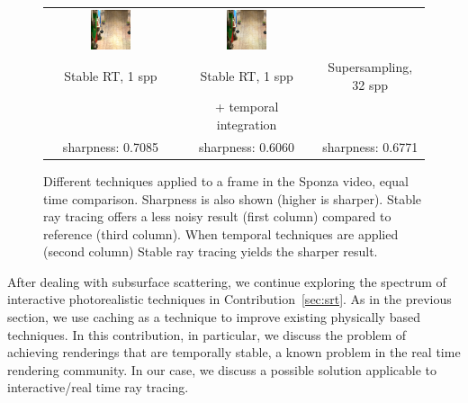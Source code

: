 \begin{figure}[t]
\begin{tabular}{@{}c@{}c@{}@{}c@{}}
	 	 \includegraphics[width=0.32\textwidth]{figures/srt_1_ti_rect_370_300_300_300_frame_211.png} &
	  \includegraphics[width=0.32\textwidth]{figures/ss_32x_rect_370_300_300_300_frame_211.png}
 \\
Stable RT, 1 spp & Stable RT, 1 spp & Supersampling, 32 spp \\
 & + temporal integration &  \\
sharpness: 0.7085 & sharpness: 0.6060 & sharpness: 0.6771 \\[-1.5ex]
\end{tabular}
\caption{Different techniques applied to a frame in the Sponza video, equal time comparison. Sharpness is also shown (higher is sharper). Stable ray tracing offers a less noisy result (first column) compared to reference (third column). When temporal techniques are applied (second column) Stable ray tracing yields the sharper result.  }
\label{fig:sponza_video_frame}
\end{figure}
After dealing with subsurface scattering, we continue exploring the spectrum of interactive photorealistic techniques in Contribution~\ref{sec:srt}. As in the previous section, we use caching as a technique to improve existing physically based techniques. In this contribution, in particular, we discuss the problem of achieving renderings that are temporally stable, a known problem in the real time rendering community. In our case, we discuss a possible solution applicable to interactive/real time ray tracing.  

